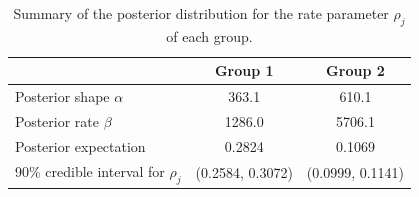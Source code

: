 \documentclass[12pt]{article}
\begin{document}
\begin{enumerate}[leftmargin=*]
\begin{enumerate}[leftmargin=1mm]
        \begin{table}[h!]
          \centering
          \begin{tabular}{lcc}
            & Group 1 & Group 2 \\
            \hline
            Posterior shape $\alpha$ & 363.1 & 610.1 \\
            \hline
            Posterior rate $\beta$ & 1286.0 & 5706.1  \\
            \hline
            Posterior expectation & 0.2824 & 0.1069 \\
            \hline
            90\% credible interval for $\rho_j$ & (0.2584, 0.3072) & (0.0999, 0.1141) \\
            \hline
          \end{tabular}
          \caption{Summary of the posterior distribution for the rate parameter $\rho_j$ of each group.}
          \label{tab:3}
        \end{table}


\end{enumerate}
\end{enumerate}
\end{document}
